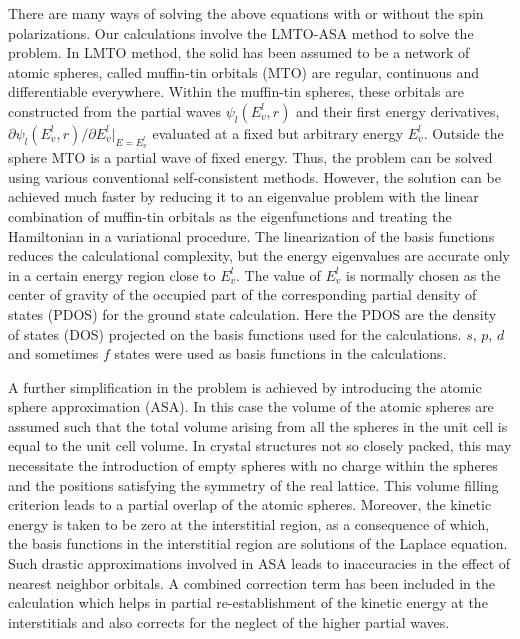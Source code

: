 There are many ways of solving the above equations with or without the spin polarizations. Our calculations involve the LMTO-ASA method to solve the problem. In LMTO method, the solid has been assumed to be a network of atomic spheres, called muffin-tin orbitals (MTO) are regular, continuous and differentiable everywhere. Within the muffin-tin spheres, these orbitals are constructed from the partial waves $\psi_{l}(E^{l}_{v},r)$ and their first energy derivatives, $\partial\psi_{l}(E^{l}_{v},r)/\partial E^{l}_{v}|_{E=E^{l}_{v}}$ evaluated at a fixed but arbitrary energy $E^{l}_{v}$. Outside the sphere MTO is a partial wave of fixed energy. Thus, the problem can be solved using various conventional self-consistent methods. However, the solution can be achieved much faster by reducing it to an eigenvalue problem with the linear combination of muffin-tin orbitals as the eigenfunctions and treating the Hamiltonian in a variational procedure. The linearization of the basis functions reduces the calculational complexity, but the energy eigenvalues are accurate only in a certain energy region close to $E^{l}_{v}$. The value of $E^{l}_{v}$ is normally chosen as the center of gravity of the occupied part of the corresponding partial density of states (PDOS) for the ground state calculation. Here the PDOS are the density of states (DOS) projected on the basis functions used for the calculations. $s$, $p$, $d$ and sometimes $f$ states were used as basis functions in the calculations.

A further simplification in the problem is achieved by introducing the atomic sphere approximation (ASA). In this case the volume of the atomic spheres are assumed such that the total volume arising from all the spheres in the unit cell is equal to the unit cell volume. In crystal structures not so closely packed, this may necessitate the introduction of empty spheres with no charge within the spheres and the positions satisfying the symmetry of the real lattice. This volume filling criterion leads to a partial overlap of the atomic spheres. Moreover, the kinetic energy is taken to be zero at the interstitial region, as a consequence of which, the basis functions in the interstitial region are solutions of the Laplace equation. Such drastic approximations involved in ASA leads to inaccuracies in the effect of nearest neighbor orbitals. A combined correction term has been included in the calculation which helps in partial re-establishment of the kinetic energy at the interstitials and also corrects for the neglect of the higher partial waves.

